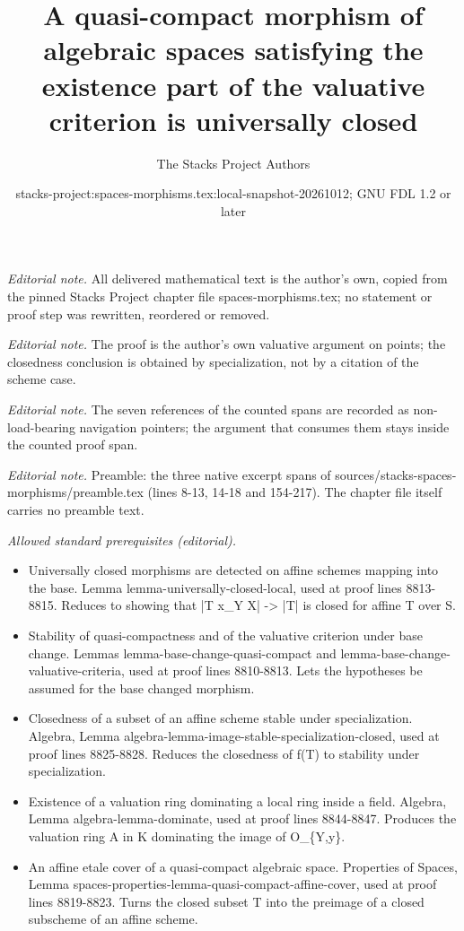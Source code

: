 \documentclass[10pt,a4paper]{amsart}
\title{A quasi-compact morphism of algebraic spaces satisfying the existence part of the valuative criterion is universally closed}
\author{The Stacks Project Authors}
\date{stacks-project:spaces-morphisms.tex:local-snapshot-20261012; GNU FDL 1.2 or later}
\theoremstyle{plain}
\theoremstyle{definition}
\theoremstyle{remark}
\numberwithin{equation}{subsection}
\begin{document}
\maketitle
\setcounter{subsection}{1}
\noindent\textit{Editorial note.} All delivered mathematical text is the author's own, copied from the pinned Stacks Project chapter file spaces-morphisms.tex; no statement or proof step was rewritten, reordered or removed.\par\medskip
\noindent\textit{Editorial note.} The proof is the author's own valuative argument on points; the closedness conclusion is obtained by specialization, not by a citation of the scheme case.\par\medskip
\noindent\textit{Editorial note.} The seven references of the counted spans are recorded as non-load-bearing navigation pointers; the argument that consumes them stays inside the counted proof span.\par\medskip
\noindent\textit{Editorial note.} Preamble: the three native excerpt spans of sources/stacks-spaces-morphisms/preamble.tex (lines 8-13, 14-18 and 154-217). The chapter file itself carries no preamble text.\par\medskip
\noindent\textit{Allowed standard prerequisites (editorial).}\begin{itemize}
\item Universally closed morphisms are detected on affine schemes mapping into the base. Lemma lemma-universally-closed-local, used at proof lines 8813-8815. Reduces to showing that |T x\_Y X| -> |T| is closed for affine T over S.
\item Stability of quasi-compactness and of the valuative criterion under base change. Lemmas lemma-base-change-quasi-compact and lemma-base-change-valuative-criteria, used at proof lines 8810-8813. Lets the hypotheses be assumed for the base changed morphism.
\item Closedness of a subset of an affine scheme stable under specialization. Algebra, Lemma algebra-lemma-image-stable-specialization-closed, used at proof lines 8825-8828. Reduces the closedness of f(T) to stability under specialization.
\item Existence of a valuation ring dominating a local ring inside a field. Algebra, Lemma algebra-lemma-dominate, used at proof lines 8844-8847. Produces the valuation ring A in K dominating the image of O\_\{Y,y\}.
\item An affine etale cover of a quasi-compact algebraic space. Properties of Spaces, Lemma spaces-properties-lemma-quasi-compact-affine-cover, used at proof lines 8819-8823. Turns the closed subset T into the preimage of a closed subscheme of an affine scheme.
\end{itemize}\medskip
\end{document}
